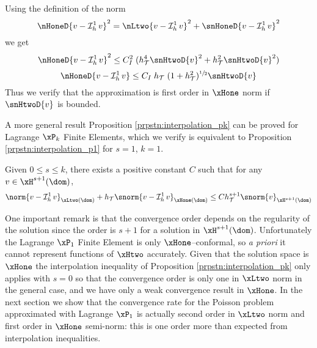 \begin{rmrk}
Using the definition of the norm
\begin{equation*}
\nHoneD{v - \Lgrh{1} v}^2 = \nLtwo{v - \Lgrh{1} v}^2 + \snHoneD{v - \Lgrh{1} v}^2
\end{equation*}
we get
\begin{equation*}
\nHoneD{v - \Lgrh{1} v}^2 \leq C_I^2\; (\sizeT^4 \snHtwoD{v}^2 + \sizeT^2 \snHtwoD{v}^2)
\end{equation*}
\begin{equation*}
\nHoneD{v - \Lgrh{1} v} \leq C_I\; \sizeT\;(1 + \sizeT^2)^{\sfrac{1}{2}} \snHtwoD{v}
\end{equation*}
Thus we verify that the approximation is first order in $\xHone$ norm if $\snHtwoD{v}$ is bounded.
\end{rmrk}

A more general result Proposition \ref{prpstn:interpolation_pk} can be proved for Lagrange $\xP_k$ Finite Elements, which we verify is equivalent to Proposition \ref{prpstn:interpolation_p1} for $s=1$, $k=1$.

\begin{prpstn}\label{prpstn:interpolation_pk}
Given $0\leq s \leq k$, there exists a positive constant $C$ such that for any $v\in\xH^{s+1}(\dom)$,
\begin{equation*}
\norm{v-\Lgrh{1}v}_{\xLtwo(\dom)} + \sizeT \snorm{v-\Lgrh{1}v}_{\xHone(\dom)}\leq C \sizeT^{s+1}\snorm{v}_{\xH^{s+1}(\dom)}
\end{equation*}
\end{prpstn}

One important remark is that the convergence order depends on the regularity of the solution since the order is $s + 1$ for a solution in $\xH^{s+1}(\dom)$.
Unfortunately the Lagrange $\xPone$ Finite Element is only $\xHone$--conformal, so \textit{a priori} it cannot represent functions of $\xHtwo$ accurately.
Given that the solution space is $\xHone$ the interpolation inequality of Proposition \ref{prpstn:interpolation_pk} only applies with $s = 0$ so that the convergence order is only one in $\xLtwo$ norm in the general case, and we have only a weak convergence result in $\xHone$.
In the next section we show that the convergence rate for the Poisson problem approximated with Lagrange $\xPone$ is actually second order in $\xLtwo$ norm and first order in $\xHone$ semi-norm: this is one order more than expected from interpolation inequalities.

